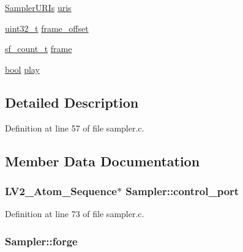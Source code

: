 \begin{DoxyCompactItemize}
\hyperlink{struct_sampler_u_r_is}{Sampler\+U\+R\+Is} \hyperlink{struct_sampler_a89f9fbca57ad4ce3fc7fcba1cb938a99}{uris}
\item 
\hyperlink{lib-src_2ffmpeg_2win32_2stdint_8h_a6eb1e68cc391dd753bc8ce896dbb8315}{uint32\+\_\+t} \hyperlink{struct_sampler_a8a85575dd4605c7b455b7f7a4524df6c}{frame\+\_\+offset}
\item 
\hyperlink{mac_2config_2i386_2lib-src_2libsndfile_2src_2sndfile_8h_a398121a5f562230ea7f772528fff5f84}{sf\+\_\+count\+\_\+t} \hyperlink{struct_sampler_a74b10f8039d2b17872e372c77ac878e0}{frame}
\item 
\hyperlink{mac_2config_2i386_2lib-src_2libsoxr_2soxr-config_8h_abb452686968e48b67397da5f97445f5b}{bool} \hyperlink{struct_sampler_aea4455563653ba8248e3b688bcb8427b}{play}
\end{DoxyCompactItemize}


\subsection{Detailed Description}


Definition at line 57 of file sampler.\+c.



\subsection{Member Data Documentation}
\subsubsection[{\texorpdfstring{control\+\_\+port}{control_port}}]{ {\bf L\+V2\+\_\+\+Atom\+\_\+\+Sequence}$\ast$ Sampler\+::control\+\_\+port}\hypertarget{struct_sampler_ab10b00c021e999dffb85947d2794cda1}{}\label{struct_sampler_ab10b00c021e999dffb85947d2794cda1}


Definition at line 73 of file sampler.\+c.

\subsubsection[{\texorpdfstring{forge}{forge}}]{ Sampler\+::forge}\hypertarget{struct_sampler_a9a2189ced88a512b6411c6d94fe67088}{}\label{struct_sampler_a9a2189ced88a512b6411c6d94fe67088}


